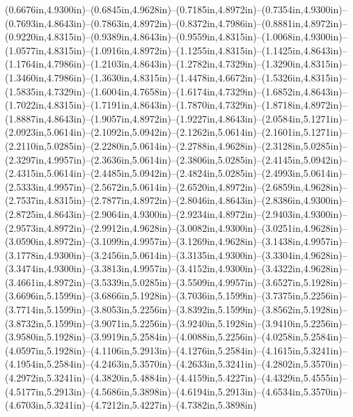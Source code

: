 (0.6676in,4.9300in)--(0.6845in,4.9628in)--(0.7185in,4.8972in)--(0.7354in,4.9300in)--(0.7693in,4.8643in)--(0.7863in,4.8972in)--(0.8372in,4.7986in)--(0.8881in,4.8972in)--(0.9220in,4.8315in)--(0.9389in,4.8643in)--(0.9559in,4.8315in)--(1.0068in,4.9300in)--(1.0577in,4.8315in)--(1.0916in,4.8972in)--(1.1255in,4.8315in)--(1.1425in,4.8643in)--(1.1764in,4.7986in)--(1.2103in,4.8643in)--(1.2782in,4.7329in)--(1.3290in,4.8315in)--(1.3460in,4.7986in)--(1.3630in,4.8315in)--(1.4478in,4.6672in)--(1.5326in,4.8315in)--(1.5835in,4.7329in)--(1.6004in,4.7658in)--(1.6174in,4.7329in)--(1.6852in,4.8643in)--(1.7022in,4.8315in)--(1.7191in,4.8643in)--(1.7870in,4.7329in)--(1.8718in,4.8972in)--(1.8887in,4.8643in)--(1.9057in,4.8972in)--(1.9227in,4.8643in)--(2.0584in,5.1271in)--(2.0923in,5.0614in)--(2.1092in,5.0942in)--(2.1262in,5.0614in)--(2.1601in,5.1271in)--(2.2110in,5.0285in)--(2.2280in,5.0614in)--(2.2788in,4.9628in)--(2.3128in,5.0285in)--(2.3297in,4.9957in)--(2.3636in,5.0614in)--(2.3806in,5.0285in)--(2.4145in,5.0942in)--(2.4315in,5.0614in)--(2.4485in,5.0942in)--(2.4824in,5.0285in)--(2.4993in,5.0614in)--(2.5333in,4.9957in)--(2.5672in,5.0614in)--(2.6520in,4.8972in)--(2.6859in,4.9628in)--(2.7537in,4.8315in)--(2.7877in,4.8972in)--(2.8046in,4.8643in)--(2.8386in,4.9300in)--(2.8725in,4.8643in)--(2.9064in,4.9300in)--(2.9234in,4.8972in)--(2.9403in,4.9300in)--(2.9573in,4.8972in)--(2.9912in,4.9628in)--(3.0082in,4.9300in)--(3.0251in,4.9628in)--(3.0590in,4.8972in)--(3.1099in,4.9957in)--(3.1269in,4.9628in)--(3.1438in,4.9957in)--(3.1778in,4.9300in)--(3.2456in,5.0614in)--(3.3135in,4.9300in)--(3.3304in,4.9628in)--(3.3474in,4.9300in)--(3.3813in,4.9957in)--(3.4152in,4.9300in)--(3.4322in,4.9628in)--(3.4661in,4.8972in)--(3.5339in,5.0285in)--(3.5509in,4.9957in)--(3.6527in,5.1928in)--(3.6696in,5.1599in)--(3.6866in,5.1928in)--(3.7036in,5.1599in)--(3.7375in,5.2256in)--(3.7714in,5.1599in)--(3.8053in,5.2256in)--(3.8392in,5.1599in)--(3.8562in,5.1928in)--(3.8732in,5.1599in)--(3.9071in,5.2256in)--(3.9240in,5.1928in)--(3.9410in,5.2256in)--(3.9580in,5.1928in)--(3.9919in,5.2584in)--(4.0088in,5.2256in)--(4.0258in,5.2584in)--(4.0597in,5.1928in)--(4.1106in,5.2913in)--(4.1276in,5.2584in)--(4.1615in,5.3241in)--(4.1954in,5.2584in)--(4.2463in,5.3570in)--(4.2633in,5.3241in)--(4.2802in,5.3570in)--(4.2972in,5.3241in)--(4.3820in,5.4884in)--(4.4159in,5.4227in)--(4.4329in,5.4555in)--(4.5177in,5.2913in)--(4.5686in,5.3898in)--(4.6194in,5.2913in)--(4.6534in,5.3570in)--(4.6703in,5.3241in)--(4.7212in,5.4227in)--(4.7382in,5.3898in) 